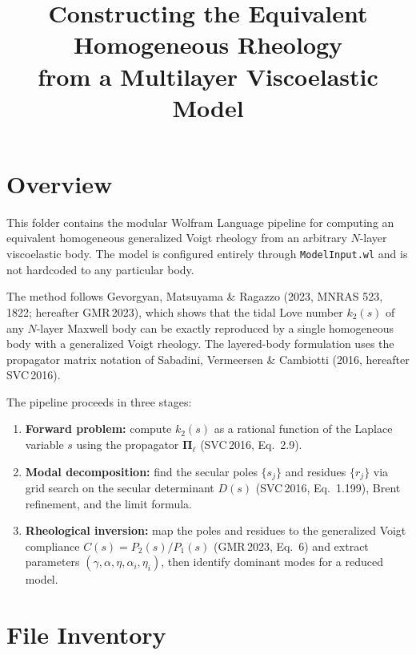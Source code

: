 \documentclass[11pt]{article}
\title{Constructing the Equivalent Homogeneous Rheology\\
  from a Multilayer Viscoelastic Model}
\author{}
\date{}
\begin{document}
\maketitle
\tableofcontents
\newpage

\section{Overview}
\label{sec:overview}

This folder contains the modular Wolfram Language pipeline for
computing an equivalent homogeneous generalized Voigt rheology from an
arbitrary $N$-layer viscoelastic body.  The model is configured
entirely through \texttt{ModelInput.wl} and is not hardcoded to any
particular body.

The method follows Gevorgyan, Matsuyama \& Ragazzo (2023, MNRAS 523,
1822; hereafter GMR\,2023), which shows that the tidal Love number
$k_2(s)$ of any $N$-layer Maxwell body can be exactly reproduced by a
single homogeneous body with a generalized Voigt rheology.  The
layered-body formulation uses the propagator matrix notation of
Sabadini, Vermeersen \& Cambiotti (2016, hereafter SVC\,2016).

The pipeline proceeds in three stages:
\begin{enumerate}
  \item \textbf{Forward problem:} compute $k_2(s)$ as a rational
    function of the Laplace variable $s$ using the propagator
    $\mathbf{\Pi}_\ell$ (SVC\,2016, Eq.~2.9).
  \item \textbf{Modal decomposition:} find the secular poles
    $\{s_j\}$ and residues $\{r_j\}$ via grid search on the secular
    determinant $D(s)$ (SVC\,2016, Eq.~1.199), Brent refinement, and
    the limit formula.
  \item \textbf{Rheological inversion:} map the poles and residues to
    the generalized Voigt compliance $C(s) = P_2(s)/P_1(s)$
    (GMR\,2023, Eq.~6) and extract parameters
    $(\gamma, \alpha, \eta, \alpha_i, \eta_i)$,
    then identify dominant modes for a reduced model.
\end{enumerate}

\section{File Inventory}
\label{sec:files}
\end{document}
